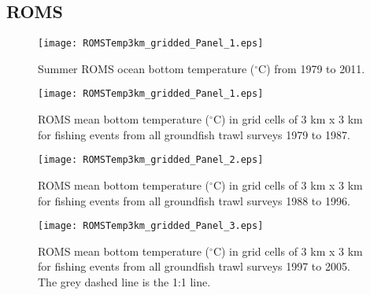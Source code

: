 \documentclass[11pt]{book}\usepackage[]{graphicx}\usepackage[]{color}
\begin{document}
\newpage

\subsection{ROMS}



\graphicspath{ {c:/GitHub/SPERA-Maps/Results/Figures/} }
\begin{figure}[!htp]
\begin{center}
\texttt{[image: ROMSTemp3km\_gridded\_Panel\_1.eps]}
\end{center}
\vspace{0mm}
\caption{Summer ROMS ocean bottom temperature ($^\circ$C) from 1979 to 2011.}
\label{fig:roms.ann.temp}
\end{figure} 

\begin{figure}[!htp]
\begin{center}
\texttt{[image: ROMSTemp3km\_gridded\_Panel\_1.eps]}
\end{center}

\caption{ROMS mean bottom temperature ($^\circ$C) in grid cells of 3 km x 3 km for fishing events from all groundfish trawl surveys 1979 to 1987.}
\label{fig:ROMStemp79to87}
\end{figure}

\newpage

\begin{figure}[!htp]
\ContinuedFloat
\begin{center}
\texttt{[image: ROMSTemp3km\_gridded\_Panel\_2.eps]}
\end{center}

\caption{ROMS mean bottom temperature ($^\circ$C) in grid cells of 3 km x 3 km for fishing events from all groundfish trawl surveys 1988 to 1996.}
\label{fig:ROMStemp88to96}
\end{figure}   

\newpage

\begin{figure}[!htp]
\ContinuedFloat
\begin{center}
\texttt{[image: ROMSTemp3km\_gridded\_Panel\_3.eps]}
\end{center}

\caption{ROMS mean bottom temperature ($^\circ$C) in grid cells of 3 km x 3 km for fishing events from all groundfish trawl surveys 1997 to 2005. The grey dashed line is the 1:1 line.}
\label{fig:ROMStemp97to05}
\end{figure}   
\end{document}
